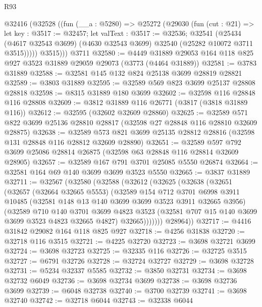 \begin{lexlean}{R93}
\begin{coremodule}
    @32416
      (@32528
        ((fun (__a : @5280) =>
        @25272
          (@29030
            (fun (cut : @21) =>
            let key : @3517 := @32457;
            let valText : @3517 := @32536;
            @32541
              (@25434
                (@4617 @32543 @3699)
                (@4630 @32543 @3699)
                @32540
                (@25282 @10072 @3711 @3515)))))
          @3515)))
    @3711
@32580 := @4449 @31889 @29053 @164 @118 @825 @927 @3523 @31889 @29059 @29073 (@3773 (@4464 @31889))
@32581 := @3783 @31889
@32588 := @32581 @145 @132 @824 @25138 @3699 @28819 @28821
@32589 := @3803 @31889
@32595 := @32589 @569 @823 @3699 @25137 @28808 @28818
@32598 := @8315 @31889 @180 @3699
@32602 := @32598 @116 @28848 @116 @28808
@32609 := @3812 @31889 @116 @26771 (@3817 (@3818 @31889 @116))
@32612 := @32595 (@32602 @32609 @28860)
@32625 := @32589 @571 @822 @3699 @25136 @28810 @28817 (@32598 @27 @28848 @116 @28810 @32609 @28875)
@32638 := @32589 @573 @821 @3699 @25135 @28812 @28816 (@32598 @131 @28848 @116 @28812 @32609 @28890)
@32651 := @32589 @597 @792 @3699 @25086 @28814 @26875 (@32598 @63 @28848 @116 @28814 @32609 @28905)
@32657 := @32589 @167 @791 @3701 @25085 @5550 @26874
@32664 := @32581 @164 @69 @140 @3699 @3699 @3523 @5550
@32665 := @3837 @31889
@32711 := @32567
    (@32580
      (@32588
        (@32612
          (@32625
            (@32638
              (@32651
                (@32657
                  (@32664 @32665 @5553)
                  (@32589
                    @154
                    @712
                    @3701
                    @6998
                    @3911
                    @10485
                    (@32581 @148 @13 @140 @3699 @3699 @3523 @3911 @32665 @3956)
                    (@32589
                      @710
                      @140
                      @3701
                      @3699
                      @4823
                      @3523
                      (@32581 @707 @15 @140 @3699 @3699 @3523 @4823 @32665 @4827)
                      @32665)))))))
        @28964))
@32717 := @4416 @31842 @29082 @164 @118 @825 @927
@32718 := @4256 @31838
@32720 := @32718 @116 @3515
@32721 := @4225 @32720
@32723 := @3698 @32721 @3699
@32724 := @3698 @32723
@32725 := @32335 @116
@32726 := @32725 @3515
@32727 := @6791 @32726
@32728 := @32724 @32727
@32729 := @3698 @32728
@32731 := @5234 @32337 @5585
@32732 := @3850 @32731
@32734 := @3698 @32732 @6049
@32736 := @3698 @32734 @3699
@32738 := @3698 @32736 @3699
@32739 := @6048 @32738
@32740 := @3700 @32739
@32741 := @3698 @32740
@32742 := @32718 @6044
@32743 := @32338 @6044

\end{coremodule}
\end{lexlean}
